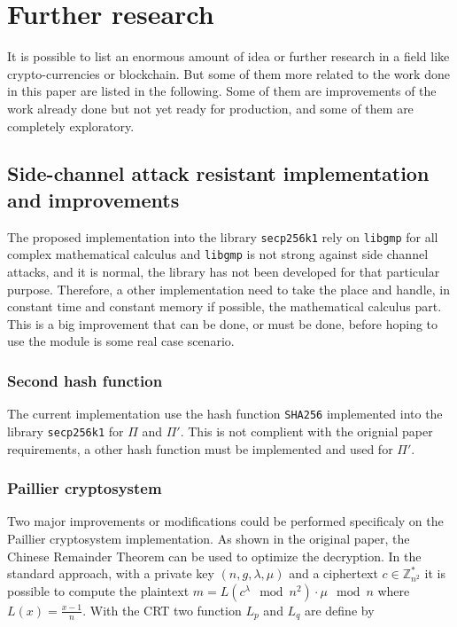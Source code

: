 \chapter{Further research}
\label{chap:furtherResearch}

It is possible to list an enormous amount of idea or further research in a field
like crypto-currencies or blockchain. But some of them more related to the work
done in this paper are listed in the following. Some of them are improvements
of the work already done but not yet ready for production, and some of them are
completely exploratory.

\section{Side-channel attack resistant implementation and improvements}

The proposed implementation into the library \texttt{secp256k1} rely on \texttt{libgmp}
for all complex mathematical calculus and \texttt{libgmp} is not strong against
side channel attacks, and it is normal, the library has not been developed for
that particular purpose. Therefore, a other implementation need to take the place
and handle, in constant time and constant memory if possible, the mathematical
calculus part. This is a big improvement that can be done, or must be done, before
hoping to use the module is some real case scenario.

\subsection{Second hash function}

The current implementation use the hash function \texttt{SHA256} implemented
into the library \texttt{secp256k1} for $\Pi$ and $\Pi'$. This is not complient
with the orignial paper requirements, a other hash function must be implemented
and used for $\Pi'$.

\subsection{Paillier cryptosystem}

Two major improvements or modifications could be performed specificaly on the
Paillier cryptosystem implementation. As shown in the original paper,
the Chinese Remainder Theorem can be used to optimize the decryption.
In the standard approach, with a private key
$(n, g, \lambda, \mu)$ and a ciphertext $c \in \mathbb{Z}_{n^2}^*$ it is possible
to compute the plaintext $m = L(c^{\lambda} \mod n^2) \cdot \mu \mod n$
where $L(x) = \frac{x-1}{n}$. With the CRT two function $L_p$ and $L_q$ are
define by

